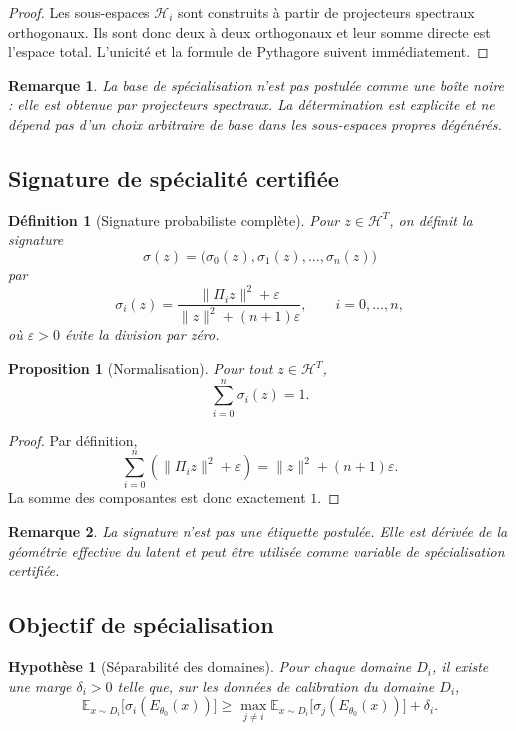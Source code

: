 \documentclass[11pt,a4paper]{article}
\newtheorem{definition}{Définition}[section]
\newtheorem{assumption}{Hypothèse}[section]
\newtheorem{proposition}{Proposition}[section]
\newtheorem{remark}{Remarque}[section]
\newcommand{\Hh}{\mathcal H}
\newcommand{\1}{\mathbf 1}
\begin{document}
\begin{proof}
Les sous-espaces \(\Hh_i\) sont construits à partir de projecteurs spectraux orthogonaux.  
Ils sont donc deux à deux orthogonaux et leur somme directe est l'espace total.  
L'unicité et la formule de Pythagore suivent immédiatement.
\end{proof}

\begin{remark}
La base de spécialisation n'est pas postulée comme une boîte noire : elle est obtenue par projecteurs spectraux.  
La détermination est explicite et ne dépend pas d'un choix arbitraire de base dans les sous-espaces propres dégénérés.
\end{remark}

\subsection{Signature de spécialité certifiée}

\begin{definition}[Signature probabiliste complète]
Pour \(z\in\Hh^T\), on définit la signature
\[
\sigma(z)=\bigl(\sigma_0(z),\sigma_1(z),\dots,\sigma_n(z)\bigr)
\]
par
\[
\sigma_i(z)
=
\frac{\|\Pi_i z\|^2+\varepsilon}{\|z\|^2+(n+1)\varepsilon},
\qquad i=0,\dots,n,
\]
où \(\varepsilon>0\) évite la division par zéro.
\end{definition}

\begin{proposition}[Normalisation]
Pour tout \(z\in\Hh^T\),
\[
\sum_{i=0}^n \sigma_i(z)=1.
\]
\end{proposition}

\begin{proof}
Par définition,
\[
\sum_{i=0}^n(\|\Pi_i z\|^2+\varepsilon)
=
\|z\|^2+(n+1)\varepsilon.
\]
La somme des composantes est donc exactement \(1\).
\end{proof}

\begin{remark}
La signature n'est pas une étiquette postulée.  
Elle est dérivée de la géométrie effective du latent et peut être utilisée comme variable de spécialisation certifiée.
\end{remark}

\subsection{Objectif de spécialisation}

\begin{assumption}[Séparabilité des domaines]
Pour chaque domaine \(D_i\), il existe une marge \(\delta_i>0\) telle que, sur les données de calibration du domaine \(D_i\),
\[
\mathbb E_{x\sim D_i}\bigl[\sigma_i(E_{\theta_0}(x))\bigr]
\ge
\max_{j\neq i}\mathbb E_{x\sim D_i}\bigl[\sigma_j(E_{\theta_0}(x))\bigr]
+\delta_i.
\]
\end{assumption}
\end{document}
